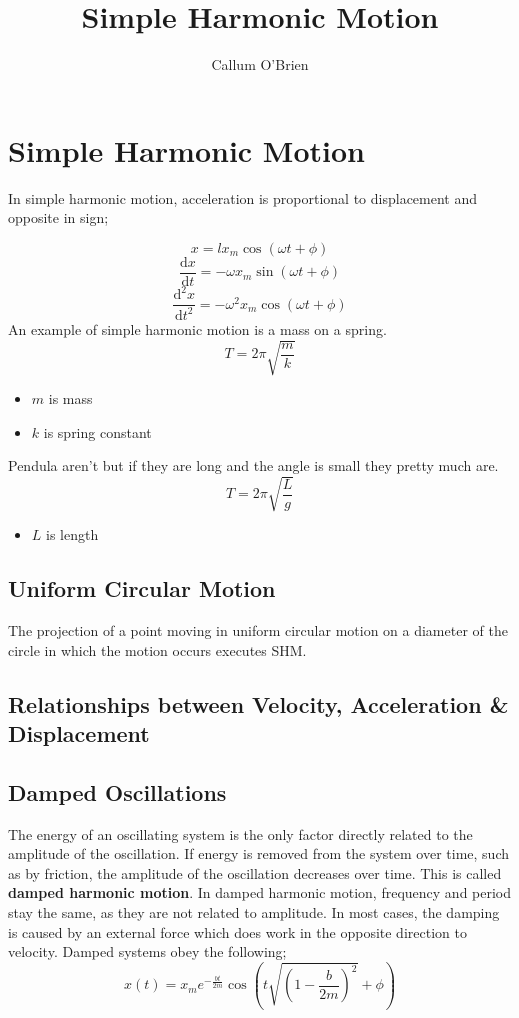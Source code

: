 \documentclass{article}
\title{Simple Harmonic Motion}
\author{Callum O'Brien}
\begin{document}
\maketitle
\tableofcontents
\newpage

\section{Simple Harmonic Motion}

\noindent In simple harmonic motion, acceleration is proportional to displacement and opposite in sign;

\[x=lx_m\cos(\omega t+\phi)\]
\[\frac{\textrm{d}x}{\textrm{d}t}=-\omega x_m\sin(\omega t+\phi)\]
\[\frac{\textrm{d}^2x}{\textrm{d}t^2}=-\omega^2x_m\cos(\omega t+\phi)\]
An example of simple harmonic motion is a mass on a spring. 
\[T=2\pi\sqrt{\frac{m}{k}}\]
\begin{itemize}
	\item $m$ is mass
	\item $k$ is spring constant
\end{itemize}
Pendula aren't but if they are long and the angle is small they pretty much are.
\[T=2\pi\sqrt{\frac{L}{g}}\]
\begin{itemize}
	\item $L$ is length
\end{itemize}

\subsection{Uniform Circular Motion}
The projection of a point moving in uniform circular motion on a diameter of the circle in which the motion occurs executes SHM.

\subsection{Relationships between Velocity, Acceleration \& Displacement}

\subsection{Damped Oscillations}
The energy of an oscillating system is the only factor directly related to the amplitude of the oscillation. If energy is removed from the system over time, such as by friction, the amplitude of the oscillation decreases over time. This is called \textbf{damped harmonic motion}. In damped harmonic motion, frequency and period stay the same, as they are not related to amplitude. In most cases, the damping is caused by an external force which does work in the opposite direction to velocity. Damped systems obey the following;
\[x(t)=x_me^{-\frac{bt}{2m}}\cos\left(t\sqrt{\left(1-\frac{b}{2m}\right)^2}+\phi\right)\]
\end{document}

